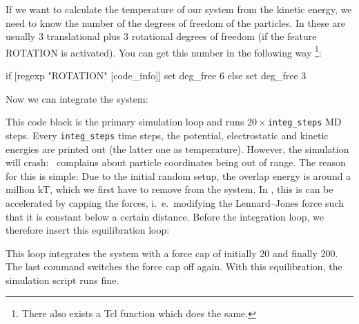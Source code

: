 If we want to calculate the temperature of our system from the kinetic
energy, we need to know the number of the degrees of freedom of the
particles.  In \es these are usually 3 translational plus 3 rotational
degrees of freedom (if the feature ROTATION is activated). You can get
this number in the following way \footnote{There also exists a Tcl
  function  which does the same.}:

\begin{tclcode}
   if { [regexp "ROTATION" [code_info]] } { 
     set deg_free 6
   } else { set deg_free 3 }
\end{tclcode}

Now we can integrate the system:
This code block is the primary simulation loop and runs
$20\times$\verb|integ_steps| MD steps. Every \verb|integ_steps| time steps, the
potential, electrostatic and kinetic energies are printed out (the latter one as
temperature). However, the simulation will crash: \es\ complains about particle
coordinates being out of range. The reason for this is simple: Due to the
initial random setup, the overlap energy is around a million kT, which we first
have to remove from the system. In \es, this is can be accelerated by capping
the forces, i.~e.\ modifying the Lennard--Jones force such that it is constant
below a certain distance. Before the integration loop, we therefore insert this
equilibration loop:
This loop integrates the system with a force cap of initially 20 and finally
200.  The last command switches the force cap off again. With this
equilibration, the simulation script runs fine.

